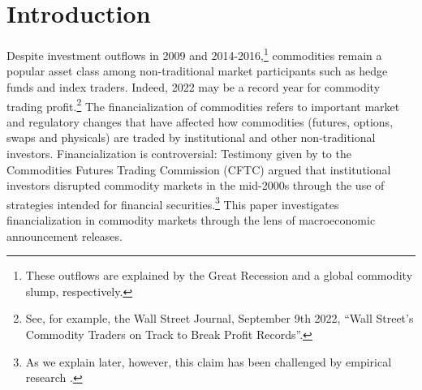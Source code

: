 \section{Introduction} \label{sec:introduction}
Despite investment outflows in 2009 and 2014-2016,\footnote{These outflows are explained by the Great Recession and a global commodity slump, respectively.} commodities remain a popular asset class among non-traditional market participants such as hedge funds and index traders.  Indeed, 2022 may be a record year for commodity trading profit.\footnote{See, for example, the Wall Street Journal, September 9th 2022, ``Wall Street's Commodity Traders on Track to Break Profit Records''.} The financialization of commodities refers to important market and regulatory changes that have affected how commodities (futures, options, swaps and physicals) are traded by institutional and other non-traditional investors.  Financialization is controversial: Testimony given by \citet{masters2009testimony} to the Commodities Futures Trading Commission (CFTC) argued  that institutional investors disrupted commodity markets in the mid-2000s through the use of strategies intended for financial securities.\footnote{As we explain later, however, this claim has been challenged by empirical research \citep*{irwin2011index,irwin2012testing,irwin2012financialization}.} This paper investigates financialization in commodity markets through the lens of macroeconomic announcement releases.

